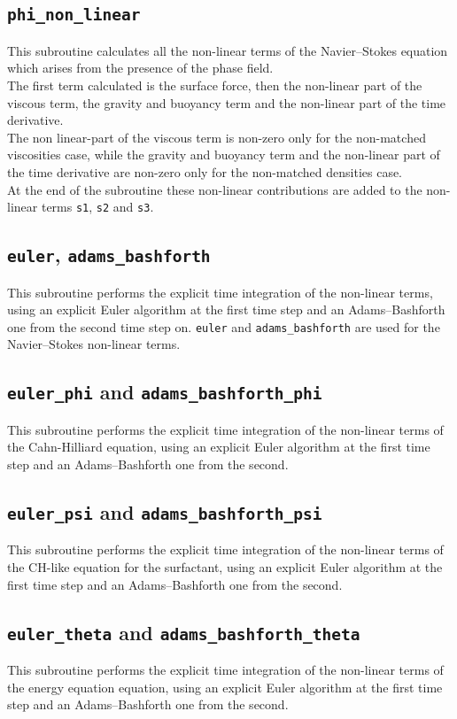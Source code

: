 \subsection{\texttt{phi\_non\_linear}}
This subroutine calculates all the non-linear terms of the Navier--Stokes equation which arises from the presence of the phase field.\\ 
The first term calculated is the surface force, then the non-linear part of the viscous term, the gravity and buoyancy term and the non-linear part of the time derivative.\\
The non linear-part of the viscous term is non-zero only for the non-matched viscosities case, while the gravity and buoyancy term and the non-linear part of the time derivative are non-zero only for the non-matched densities case.\\
At the end of the subroutine these non-linear contributions are added to the non-linear terms \texttt{s1}, \texttt{s2} and \texttt{s3}.

\subsection{\texttt{euler}, \texttt{adams\_bashforth}}
This subroutine performs the explicit time integration of the non-linear terms, using an explicit Euler algorithm at the first time step and an Adams--Bashforth one from the second time step on. 
\texttt{euler} and \texttt{adams\_bashforth} are used for the Navier--Stokes non-linear terms.

\subsection{\texttt{euler\_phi} and \texttt{adams\_bashforth\_phi}}
This subroutine performs the explicit time integration of the non-linear terms of the Cahn-Hilliard equation, using an explicit Euler algorithm at the first time step and an Adams--Bashforth one from the second.

\subsection{\texttt{euler\_psi} and \texttt{adams\_bashforth\_psi}}
This subroutine performs the explicit time integration of the non-linear terms of the CH-like equation for the surfactant, using an explicit Euler algorithm at the first time step and an Adams--Bashforth one from the second.

\subsection{\texttt{euler\_theta} and \texttt{adams\_bashforth\_theta}}
This subroutine performs the explicit time integration of the non-linear terms of the energy equation equation, using an explicit Euler algorithm at the first time step and an Adams--Bashforth one from the second.

